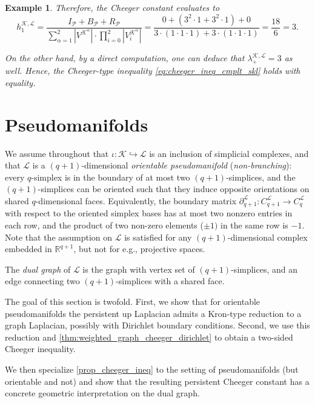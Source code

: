 \documentclass{article}
\newtheorem{example}{Example}[section]
\newcommand{\R}{\mathbb{R}}
\newcommand{\KK}{\mathcal{K}}
\newcommand{\LL}{\mathcal{L}}
\begin{document}
\begin{example}
Therefore, the Cheeger constant evaluates to
\[
h_1^{\KK, \LL}
=
\frac{I_{\mathcal{P}} + B_{\mathcal{P}} + R_{\mathcal{P}}}{\displaystyle \sum_{\alpha=1}^2 |V^{\KK^\alpha}|\cdot \prod_{i=0}^2|V^{\KK^\alpha}_i|}
=
\frac{0 + (3^2 \cdot 1 + 3^2 \cdot 1) + 0}{3 \cdot (1 \cdot 1 \cdot 1) + 3 \cdot (1 \cdot 1 \cdot 1)}
=
\frac{18}{6}=3.
\]

On the other hand, by a direct computation, one can deduce that $\lambda_{+}^{\KK, \LL}=3$ as well. Hence, the Cheeger-type inequality \cref{eq:cheeger_ineq_cmplt_skl} holds with equality.
\end{example}





\section{Pseudomanifolds}
\label{sec:psd_mfld}

We assume throughout that $\iota\colon \KK \hookrightarrow \LL$ is an inclusion of simplicial complexes, and that $\LL$ is a $(q+1)$-dimensional \emph{orientable pseudomanifold} (\emph{non-branching}): every $q$-simplex is in the boundary of at most two $(q+1)$-simplices, and the $(q+1)$-simplices can be oriented such that they induce opposite orientations on shared $q$-dimensional faces. Equivalently, 
the boundary matrix 
$\partial_{q+1}^\LL \colon C_{q+1}^\LL \longrightarrow C_{q}^\LL$
with respect to the oriented simplex bases has at most two nonzero entries in each row, and the product of two non-zero elements ($\pm 1)$ in the same row is $-1$. Note that the assumption on $\LL$ is satisfied for any $(q+1)$-dimensional complex embedded in $\R^{q+1}$, but not for e.g., projective spaces. 

The \emph{dual graph} of $\LL$ is the graph with vertex set of $(q+1)$-simplices, and an edge connecting two $(q+1)$-simplices with a shared face. 

The goal of this section is twofold. First, we show that for orientable pseudomanifolds the persistent up Laplacian admits a Kron-type reduction to a graph Laplacian, possibly with Dirichlet boundary conditions. Second, we use this reduction and \cref{thm:weighted_graph_cheeger_dirichlet} to obtain a two-sided Cheeger inequality.

We then specialize \cref{prop_cheeger_ineq} to the setting of pseudomanifolds (but orientable and not) and show that the resulting persistent Cheeger constant has a concrete geometric interpretation on the dual graph.
\end{document}
